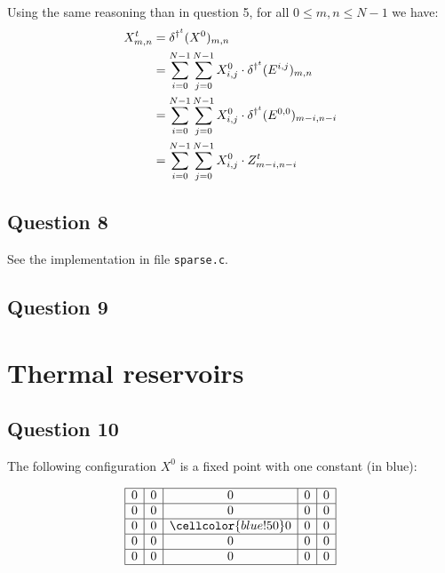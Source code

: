 Using the same reasoning than in question 5, for all $0 \leq m, n \leq N-1$ we have:
\begin{equation}
 \label{qsevenrel}
 \begin{split}
    X^t_{m,n} & = \delta^{\dag^t} (X^0)_{m,n} \\
              & = \sum_{i=0}^{N-1} \sum_{j=0}^{N-1} X^0_{i,j} \cdot \delta^{\dag^t} (E^{i,j})_{m,n} \\
              & = \sum_{i=0}^{N-1} \sum_{j=0}^{N-1} X^0_{i,j} \cdot \delta^{\dag^t} (E^{0,0})_{m-i,n-i} \\
              & = \sum_{i=0}^{N-1} \sum_{j=0}^{N-1} X^0_{i,j} \cdot Z^t_{m-i,n-i} \\
 \end{split}
\end{equation}


\subsection*{Question 8}

See the implementation in file \texttt{sparse.c}.


\subsection*{Question 9}


\section{Thermal reservoirs}


\subsection*{Question 10}
 
\begin{ex}
  The following configuration $X^0$ is a fixed point with one constant (in blue):
  
  \[\begin{array}{ | c | c | c | c | c |} \hline
    0 & 0 & 0 & 0 & 0\\ \hline
    0 & 0 & 0 & 0 & 0\\ \hline
    0 & 0 & \cellcolor{blue!50} 0 & 0 & 0\\ \hline
    0 & 0 & 0 & 0 & 0\\ \hline
    0 & 0 & 0 & 0 & 0\\ \hline
  \end{array}\]
\end{ex}

